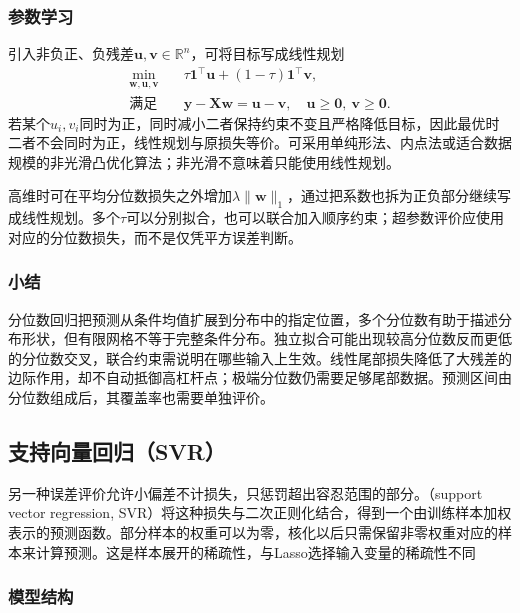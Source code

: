 \subsubsection{参数学习}

引入非负正、负残差$\bm{u},\bm{v}\in\mathbb{R}^{n}$，可将目标写成线性规划
\begin{equation}
  \begin{aligned}
    \min_{\bm{w},\bm{u},\bm{v}}\quad&
      \tau\bm{1}^{\top}\bm{u}+(1-\tau)\bm{1}^{\top}\bm{v},\\
    \text{满足}\quad&
      \bm{y}-\bm{X}\bm{w}=\bm{u}-\bm{v},
      \quad\bm{u}\geq\bm{0},\ \bm{v}\geq\bm{0}.
  \end{aligned}
  \label{eq:regression-quantile-lp}
\end{equation}
若某个$u_i,v_i$同时为正，同时减小二者保持约束不变且严格降低目标，因此最优时二者不会同时为正，线性规划与原损失等价。可采用单纯形法、内点法或适合数据规模的非光滑凸优化算法；非光滑不意味着只能使用线性规划。

高维时可在平均分位数损失之外增加$\lambda\lVert\bm{w}\rVert_1$，通过把系数也拆为正负部分继续写成线性规划。多个$\tau$可以分别拟合，也可以联合加入顺序约束；超参数评价应使用对应的分位数损失，而不是仅凭平方误差判断。

\subsubsection{小结}

分位数回归把预测从条件均值扩展到分布中的指定位置，多个分位数有助于描述分布形状，但有限网格不等于完整条件分布。独立拟合可能出现较高分位数反而更低的分位数交叉，联合约束需说明在哪些输入上生效。线性尾部损失降低了大残差的边际作用，却不自动抵御高杠杆点；极端分位数仍需要足够尾部数据。预测区间由分位数组成后，其覆盖率也需要单独评价。

\subsection{支持向量回归（SVR）}
\label{sec:regression-svr}

另一种误差评价允许小偏差不计损失，只惩罚超出容忍范围的部分。（support vector regression, SVR）将这种损失与二次正则化结合，得到一个由训练样本加权表示的预测函数。部分样本的权重可以为零，核化以后只需保留非零权重对应的样本来计算预测。这是样本展开的稀疏性，与Lasso选择输入变量的稀疏性不同

\subsubsection{模型结构}

